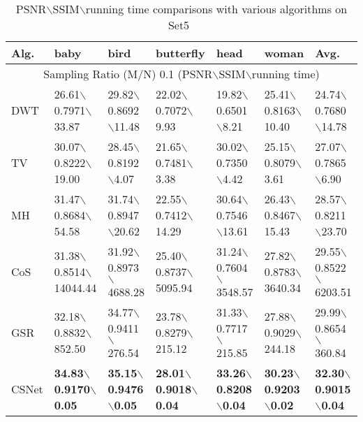 \documentclass[5pt]{article}
\begin{document}
\begin{table*}[t]\footnotesize
\centering
\caption{\small {PSNR$\backslash$SSIM$\backslash$running time comparisons with various algorithms on Set5~\cite{rf23}}}\label{tab:tab1}
\begin{tabular}{|l|l|l|l|l|l|l|}
\hline
Alg. & baby & bird & butterfly & head & woman & Avg.\\
\hline
\multicolumn{7}{|c|}{Sampling Ratio (M/N) 0.1 (PSNR$\backslash$SSIM$\backslash$running time)}\\
\hline
DWT & 26.61$\backslash$0.7971$\backslash$33.87 & 29.82$\backslash$0.8692$\backslash$11.48 & 22.02$\backslash$0.7072$\backslash$9.93 & 19.82$\backslash$0.6501$\backslash$8.21 & 25.41$\backslash$0.8163$\backslash$10.40 & 24.74$\backslash$0.7680$\backslash$14.78\\
\hline
TV & 30.07$\backslash$0.8222$\backslash$19.00 & 28.45$\backslash$0.8192$\backslash$4.07 & 21.65$\backslash$0.7481$\backslash$3.38 & 30.02$\backslash$0.7350$\backslash$4.42 & 25.15$\backslash$0.8079$\backslash$3.61 & 27.07$\backslash$0.7865$\backslash$6.90\\
\hline
MH & 31.47$\backslash$0.8684$\backslash$54.58 & 31.74$\backslash$0.8947$\backslash$20.62 & 22.55$\backslash$0.7412$\backslash$14.29 & 30.64$\backslash$0.7546$\backslash$13.61 & 26.43$\backslash$0.8467$\backslash$15.43 & 28.57$\backslash$0.8211$\backslash$23.70\\
\hline
CoS & 31.38$\backslash$0.8514$\backslash$\tiny 14044.44 & 31.92$\backslash$0.8973$\backslash$ \tiny 4688.28 & 25.40$\backslash$0.8737$\backslash$\tiny 5095.94 & 31.24$\backslash$0.7604$\backslash$\tiny 3548.57 & 27.82$\backslash$0.8783$\backslash$\tiny 3640.34 & 29.55$\backslash$0.8522$\backslash$\tiny 6203.51\\
\hline
GSR & 32.18$\backslash$0.8832$\backslash$852.50 & 34.77$\backslash$0.9411$\backslash$276.54 & 23.78$\backslash$0.8279$\backslash$215.12 & 31.33$\backslash$0.7717$\backslash$215.85 & 27.88$\backslash$0.9029$\backslash$244.18 & 29.99$\backslash$0.8654$\backslash$360.84\\
\hline
CSNet & \textbf{34.83}$\backslash$\textbf{0.9170}$\backslash$\textbf{0.05} & \textbf{35.15}$\backslash$\textbf{0.9476}$\backslash$\textbf{0.05} & \textbf{28.01}$\backslash$\textbf{0.9018}$\backslash$\textbf{0.04} & \textbf{33.26}$\backslash$\textbf{0.8208}$\backslash$\textbf{0.04} & \textbf{30.23}$\backslash$\textbf{0.9203}$\backslash$\textbf{0.02} & \textbf{32.30}$\backslash$\textbf{0.9015}$\backslash$\textbf{0.04}\\

\end{tabular}
\end{table*}
\end{document}
